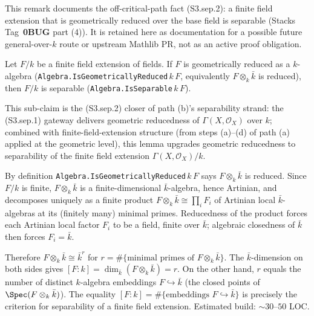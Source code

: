 \begin{remark}
  This remark documents the off-critical-path fact (S3.sep.2): a finite field extension that is geometrically reduced over the base field is separable (Stacks Tag~\textbf{0BUG} part (4)). It is retained here as documentation for a possible future general-over-\(k\) route or upstream Mathlib PR, not as an active proof obligation.

  Let \(F / k\) be a finite field extension of fields. If \(F\) is geometrically reduced as a \(k\)-algebra (\texttt{Algebra.IsGeometricallyReduced}\,\(k\)\,\(F\), equivalently \(F \otimes_k \bar k\) is reduced), then \(F / k\) is separable (\texttt{Algebra.IsSeparable}\,\(k\)\,\(F\)).

  This sub-claim is the (S3.sep.2) closer of path (b)'s separability strand: the (S3.sep.1) gateway delivers geometric reducedness of \(\Gamma(X, \mathcal O_X)\) over \(k\); combined with finite-field-extension structure (from steps (a)--(d) of path (a) applied at the geometric level), this lemma upgrades geometric reducedness to separability of the finite field extension \(\Gamma(X, \mathcal O_X) / k\).

  By definition \texttt{Algebra.IsGeometricallyReduced}\,\(k\)\,\(F\) says \(F \otimes_k \bar k\) is reduced. Since \(F / k\) is finite, \(F \otimes_k \bar k\) is a finite-dimensional \(\bar k\)-algebra, hence Artinian, and decomposes uniquely as a finite product \(F \otimes_k \bar k \cong \prod_i F_i\) of Artinian local \(\bar k\)-algebras at its (finitely many) minimal primes. Reducedness of the product forces each Artinian local factor \(F_i\) to be a field, finite over \(\bar k\); algebraic closedness of \(\bar k\) then forces \(F_i = \bar k\).

  Therefore \(F \otimes_k \bar k \cong \bar k^{r}\) for \(r = \#\{\text{minimal primes of } F \otimes_k \bar k\}\). The \(\bar k\)-dimension on both sides gives \([F : k] = \dim_{\bar k}(F \otimes_k \bar k) = r\). On the other hand, \(r\) equals the number of distinct \(k\)-algebra embeddings \(F \hookrightarrow \bar k\) (the closed points of \(\Spec(F \otimes_k \bar k)\)). The equality \([F : k] = \#\{\text{embeddings } F \hookrightarrow \bar k\}\) is precisely the criterion for separability of a finite field extension. Estimated build: \(\sim 30\)--\(50\) LOC.


\end{remark}
